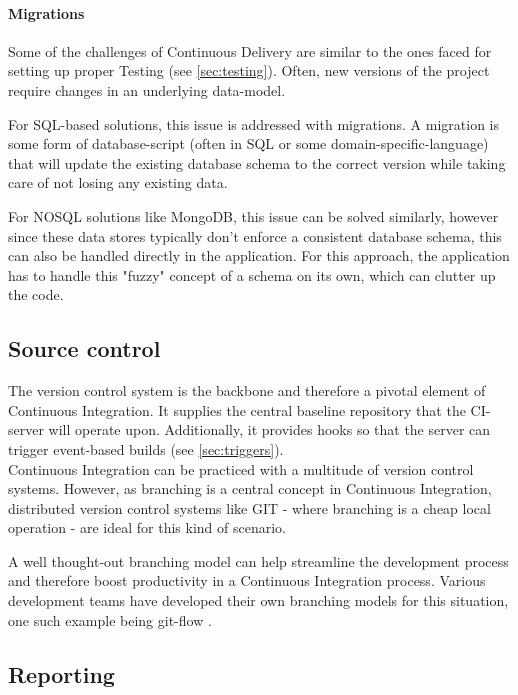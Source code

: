 \paragraph{Migrations}\label{sec:migrations}

Some of the challenges of Continuous Delivery are similar to the ones faced for
setting up proper Testing (see \ref{sec:testing}). Often, new versions of the
project require changes in an underlying data-model. 

For SQL-based solutions, this issue is addressed with migrations. A migration is
some form of database-script (often in SQL or some domain-specific-language)
that will update the existing database schema to the correct version while
taking care of not losing any existing data.

For NOSQL solutions like MongoDB, this issue can be solved similarly, however
since these data stores typically don't enforce a consistent database schema,
this can also be handled directly in the application. For this approach, the
application has to handle this "fuzzy" concept of a schema on its own, which can
clutter up the code.

\subsection{Source control}\label{sec:source-control}

The version control system is the backbone and therefore a pivotal element of
Continuous Integration. It supplies the central baseline repository that the
CI-server will operate upon. Additionally, it provides hooks so that the server
can trigger event-based builds (see \ref{sec:triggers}).\\

Continuous Integration can be practiced with a multitude of version control
systems. However, as branching is a central concept in Continuous Integration,
distributed version control systems like GIT - where branching is a cheap local
operation - are ideal for this kind of scenario.

A well thought-out branching model can help streamline the development process
and therefore boost productivity in a Continuous Integration process. Various
development teams have developed their own branching models for this situation,
one such example being git-flow \cite{driessen:2010}.\\

\subsection{Reporting}\label{sec:reporting}



